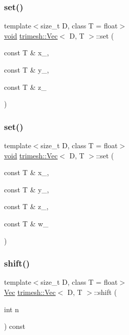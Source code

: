 \subsubsection{\texorpdfstring{set()}{set()}\hspace{0.1cm}{\footnotesize\ttfamily [3/4]}}
{\footnotesize\ttfamily template$<$size\+\_\+t D, class T = float$>$ \\
\hyperlink{namespacetrimesh_a784ddfd979e1c579bda795a8edfc3f43}{void} \hyperlink{classtrimesh_1_1Vec}{trimesh\+::\+Vec}$<$ D, T $>$\+::set (\begin{DoxyParamCaption}\item[{const T \&}]{x\+\_\+,  }\item[{const T \&}]{y\+\_\+,  }\item[{const T \&}]{z\+\_\+ }\end{DoxyParamCaption})\hspace{0.3cm}{\ttfamily [inline]}}

\mbox{\label{classtrimesh_1_1Vec_a2af3a23c74de67de33d5cc5d1caaa87a}} 
\subsubsection{\texorpdfstring{set()}{set()}\hspace{0.1cm}{\footnotesize\ttfamily [4/4]}}
{\footnotesize\ttfamily template$<$size\+\_\+t D, class T = float$>$ \\
\hyperlink{namespacetrimesh_a784ddfd979e1c579bda795a8edfc3f43}{void} \hyperlink{classtrimesh_1_1Vec}{trimesh\+::\+Vec}$<$ D, T $>$\+::set (\begin{DoxyParamCaption}\item[{const T \&}]{x\+\_\+,  }\item[{const T \&}]{y\+\_\+,  }\item[{const T \&}]{z\+\_\+,  }\item[{const T \&}]{w\+\_\+ }\end{DoxyParamCaption})\hspace{0.3cm}{\ttfamily [inline]}}

\mbox{\label{classtrimesh_1_1Vec_a2faa06f21863d62c9cf3343d494d08cb}} 
\subsubsection{\texorpdfstring{shift()}{shift()}}
{\footnotesize\ttfamily template$<$size\+\_\+t D, class T = float$>$ \\
\hyperlink{classtrimesh_1_1Vec}{Vec} \hyperlink{classtrimesh_1_1Vec}{trimesh\+::\+Vec}$<$ D, T $>$\+::shift (\begin{DoxyParamCaption}\item[{int}]{n }\end{DoxyParamCaption}) const\hspace{0.3cm}{\ttfamily [inline]}}


